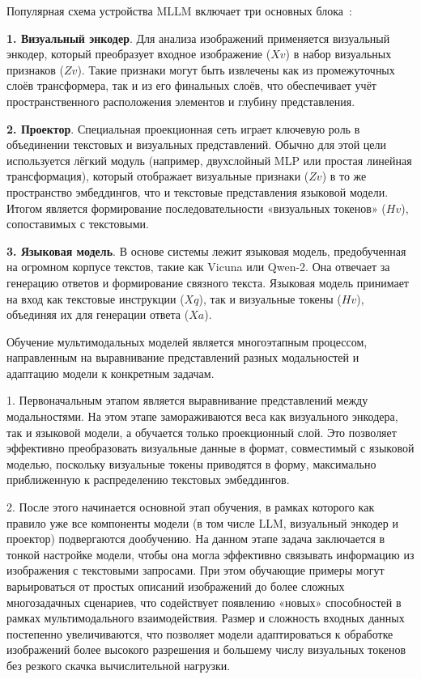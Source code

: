 \documentclass[LI,KR]{HSEUniversity}
\begin{document}
Популярная схема устройства MLLM включает три основных блока~\cite{llavaonevision, llava}:

\textbf{1. Визуальный энкодер}.
Для анализа изображений применяется визуальный энкодер, который преобразует входное изображение ($Xv$) в набор визуальных признаков ($Zv$).
Такие признаки могут быть извлечены как из промежуточных слоёв трансформера, так и из его финальных слоёв,
что обеспечивает учёт пространственного расположения элементов и глубину представления.

\textbf{2. Проектор}.
Специальная проекционная сеть играет ключевую роль в объединении текстовых и визуальных представлений.
Обычно для этой цели используется лёгкий модуль (например, двухслойный MLP или простая линейная трансформация),
который отображает визуальные признаки ($Zv$) в то же пространство эмбеддингов, что и текстовые представления языковой модели.
Итогом является формирование последовательности «визуальных токенов» ($Hv$), сопоставимых с текстовыми.

\textbf{3. Языковая модель}.
В основе системы лежит языковая модель, предобученная на огромном корпусе текстов, такие как Vicuna или Qwen-2.
Она отвечает за генерацию ответов и формирование связного текста.
Языковая модель принимает на вход как текстовые инструкции ($Xq$), так и визуальные токены ($Hv$), объединяя их для генерации ответа ($Xa$).

Обучение мультимодальных моделей является многоэтапным процессом, направленным на выравнивание представлений разных модальностей и адаптацию модели к конкретным задачам.

1. Первоначальным этапом является выравнивание представлений между модальностями.
На этом этапе замораживаются веса как визуального энкодера, так и языковой модели, а обучается только проекционный слой.
Это позволяет эффективно преобразовать визуальные данные в формат, совместимый с языковой моделью, поскольку визуальные токены приводятся в форму,
максимально приближенную к распределению текстовых эмбеддингов.

2. После этого начинается основной этап обучения, в рамках которого как правило уже все компоненты модели (в том числе LLM, визуальный энкодер и проектор) подвергаются дообучению.
На данном этапе задача заключается в тонкой настройке модели, чтобы она могла эффективно связывать информацию из изображения с текстовыми запросами.
При этом обучающие примеры могут варьироваться от простых описаний изображений до более сложных многозадачных сценариев, что содействует появлению «новых» способностей в рамках мультимодального взаимодействия. Размер и сложность входных данных постепенно увеличиваются, что позволяет модели адаптироваться к обработке изображений более высокого разрешения и большему числу визуальных токенов без резкого скачка вычислительной нагрузки.
\end{document}
